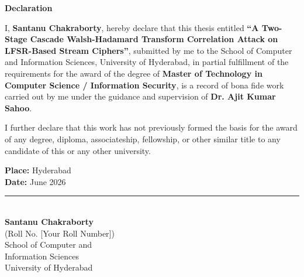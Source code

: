 \newpage
\thispagestyle{empty}

\begin{center}
    \Large\textbf{Declaration}
\end{center}

\vspace{1.5cm}

\begin{onehalfspace}
\noindent
I, \textbf{Santanu Chakraborty}, hereby declare that this thesis entitled \textbf{``A Two-Stage Cascade Walsh-Hadamard Transform Correlation Attack on LFSR-Based Stream Ciphers''}, submitted by me to the School of Computer and Information Sciences, University of Hyderabad, in partial fulfillment of the requirements for the award of the degree of \textbf{Master of Technology in Computer Science / Information Security}, is a record of bona fide work carried out by me under the guidance and supervision of \textbf{Dr. Ajit Kumar Sahoo}.

\noindent
I further declare that this work has not previously formed the basis for the award of any degree, diploma, associateship, fellowship, or other similar title to any candidate of this or any other university.
\end{onehalfspace}

\vspace{4cm}

\noindent
\begin{minipage}[t]{0.45\textwidth}
    \textbf{Place:} Hyderabad \\
    \textbf{Date:} June 2026
\end{minipage}
\hfill
\begin{minipage}[t]{0.45\textwidth}
    \centering
    \rule{5cm}{0.4pt} \\
    \textbf{Santanu Chakraborty} \\
    (Roll No. [Your Roll Number]) \\
    School of Computer and \\
    Information Sciences \\
    University of Hyderabad
\end{minipage}
